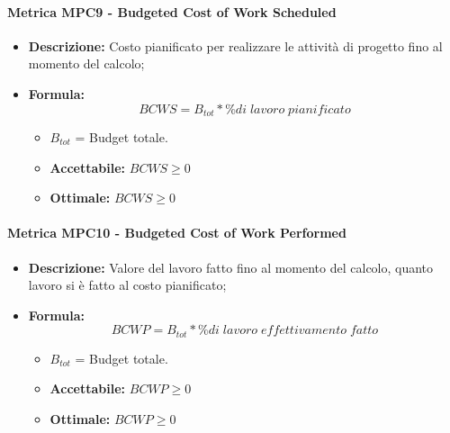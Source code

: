\paragraph{Metrica MPC9 - Budgeted Cost of Work Scheduled}
\begin{itemize}
	\item \textbf{Descrizione:} Costo pianificato per realizzare le attività di progetto fino al momento del calcolo;
	\item \textbf{Formula:} $$BCWS = {B_{tot} * \% di\; lavoro\; pianificato}$$
	\begin{itemize}
		\item $B_{tot}$ = Budget totale.
	\end{itemize}
	\begin{itemize}
		\item \textbf{Accettabile:} $BCWS \geq 0$
		\item \textbf{Ottimale:} $BCWS \geq 0$
	\end{itemize}
\end{itemize}

\paragraph{Metrica MPC10 - Budgeted Cost of Work Performed}
\begin{itemize}
	\item \textbf{Descrizione:} Valore del lavoro fatto fino al momento del calcolo, quanto lavoro si è fatto al costo pianificato;
	\item \textbf{Formula:} $$BCWP = {B_{tot} * \% di\; lavoro\; effettivamento\; fatto}$$
	 	\begin{itemize}
	 	\item $B_{tot}$ = Budget totale.
	 \end{itemize}
	 \begin{itemize}
	 	\item \textbf{Accettabile:} $BCWP \geq 0$
	 	\item \textbf{Ottimale:} $BCWP \geq 0$
	 \end{itemize}

\end{itemize}

